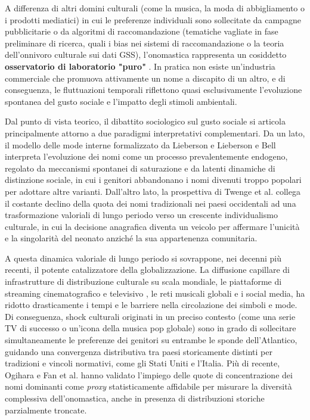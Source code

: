 \documentclass[conference]{IEEEtran}
\begin{document}
A differenza di altri domini culturali (come la musica, la moda di abbigliamento o i prodotti mediatici) 
in cui le preferenze individuali sono sollecitate da campagne pubblicitarie o da algoritmi di raccomandazione
 (tematiche vagliate in fase preliminare di ricerca, quali i bias nei sistemi di raccomandazione 
o la teoria dell'onnivoro culturale sui dati GSS), l'onomastica rappresenta un cosiddetto
 \textbf{osservatorio di laboratorio "puro"} \cite{lieberson2000}. 
 In pratica non esiste un'industria commerciale che promuova attivamente un nome a discapito di un altro, 
 e di conseguenza, le fluttuazioni temporali riflettono quasi esclusivamente l'evoluzione spontanea 
 del gusto sociale e l'impatto degli stimoli ambientali.

Dal punto di vista teorico, il dibattito sociologico sul gusto sociale si articola principalmente 
attorno a due paradigmi interpretativi complementari. Da un lato, il modello delle mode interne 
formalizzato da Lieberson \cite{lieberson2000} e Lieberson e Bell \cite{lieberson1992} interpreta 
l'evoluzione dei nomi come un processo prevalentemente endogeno, regolato da meccanismi spontanei 
di saturazione e da latenti dinamiche di distinzione sociale, in cui i genitori abbandonano i nomi divenuti 
troppo popolari per adottare altre varianti. 
Dall'altro lato, la prospettiva di Twenge et al. \cite{twenge2010, twenge2016} collega il costante 
declino della quota dei nomi tradizionali nei paesi occidentali ad una trasformazione valoriali di lungo 
periodo verso un crescente individualismo culturale, in cui la decisione anagrafica diventa un veicolo per 
affermare l'unicità e la singolarità del neonato anziché la sua appartenenza comunitaria.

A questa dinamica valoriale di lungo periodo si sovrappone, nei decenni più recenti, 
il potente catalizzatore della globalizzazione. La diffusione capillare di infrastrutture di 
distribuzione culturale su scala mondiale, le piattaforme di streaming cinematografico e televisivo
, le reti musicali globali e i social media, ha ridotto drasticamente i tempi e le barriere 
nella circolazione dei simboli e mode. Di conseguenza, shock culturali originati in un preciso contesto 
(come una serie TV di successo o un'icona della musica pop globale) sono in grado di sollecitare 
simultaneamente le preferenze dei genitori su entrambe le sponde dell'Atlantico, guidando una 
convergenza distributiva tra paesi storicamente distinti per tradizioni e vincoli normativi, 
come gli Stati Uniti e l'Italia. 
Più di recente, Ogihara \cite{ogihara2025a} e Fan et al. \cite{fan2025} hanno validato l'impiego 
delle quote di concentrazione dei nomi dominanti come \emph{proxy} statisticamente affidabile 
per misurare la diversità complessiva dell'onomastica, anche in presenza di distribuzioni storiche 
parzialmente troncate.
\end{document}
